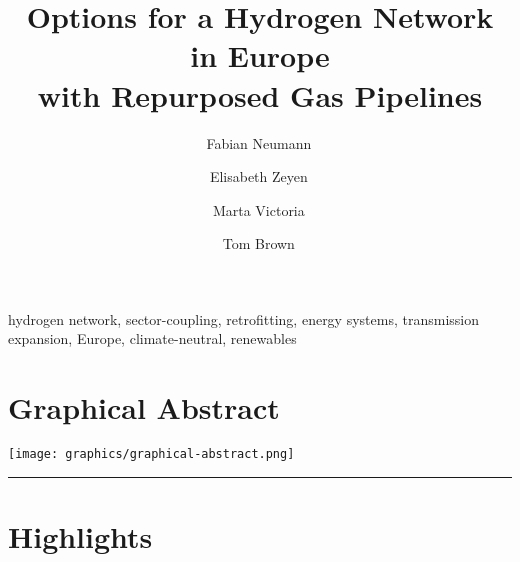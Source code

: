 \documentclass[12pt,preprint]{elsarticle}
\begin{document}
\begin{frontmatter}

	\title{Options for a Hydrogen Network in Europe\\with Repurposed Gas Pipelines}

	\author[tubaddress]{Fabian Neumann\,}
	\author[tubaddress]{Elisabeth Zeyen\,}
	\author[aarhus,aarhus2]{Marta Victoria\,}
	\author[tubaddress]{Tom Brown\,}
	\address[tubaddress]{Department of Digital Transformation in Energy Systems, Institute of Energy Technology, Technische Universität Berlin, Fakultät III, Einsteinufer 25 (TA 8), 10587 Berlin, Germany}
	\address[aarhus]{Department of Mechanical and Production Engineering, Aarhus University, Inge Lehmanns Gade 10, 8000 Aarhus, Denmark}
	\address[aarhus2]{Novo Nordisk Foundation CO$_2$ Research Center, Aarhus University, Aarhus, Denmark}

	\begin{abstract}
		
	\end{abstract}

	\begin{keyword}
		hydrogen network, sector-coupling, retrofitting, energy systems, transmission expansion, Europe, climate-neutral, renewables
	\end{keyword}


\end{frontmatter}

\section*{Graphical Abstract}


\texttt{[image: graphics/graphical-abstract.png]}

\par\noindent\rule{\textwidth}{0.4pt}

\section*{Highlights}
\end{document}
